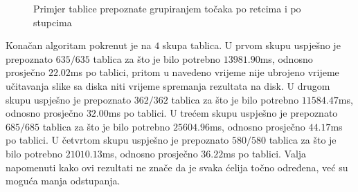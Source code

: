 \documentclass[times, utf8, zavrsni, numeric]{fer}
\begin{document}
\begin{figure}[ht!]
    \centering
    \captionsetup{justification=centering}
    \caption{Primjer tablice prepoznate grupiranjem točaka po retcima i po stupcima}
    \label{fig:tableV2}
\end{figure}

Konačan algoritam pokrenut je na $4$ skupa tablica.
U prvom skupu uspješno je prepoznato $635/635$ tablica za što je bilo potrebno $13981.90$ms, odnosno prosječno $22.02$ms po tablici, pritom u navedeno vrijeme nije ubrojeno vrijeme učitavanja slike sa diska niti vrijeme spremanja rezultata na disk.
U drugom skupu uspješno je prepoznato $362/362$ tablica za što je bilo potrebno $11584.47$ms, odnosno prosječno $32.00$ms po tablici.
U trećem skupu uspješno je prepoznato $685/685$ tablica za što je bilo potrebno $25604.96$ms, odnosno prosječno $44.17$ms po tablici.
U četvrtom skupu uspješno je prepoznato $580/580$ tablica za što je bilo potrebno $21010.13$ms, odnosno prosječno $36.22$ms po tablici.
Valja napomenuti kako ovi rezultati ne znače da je svaka ćelija točno određena, već su moguća manja odstupanja.\\
\end{document}
